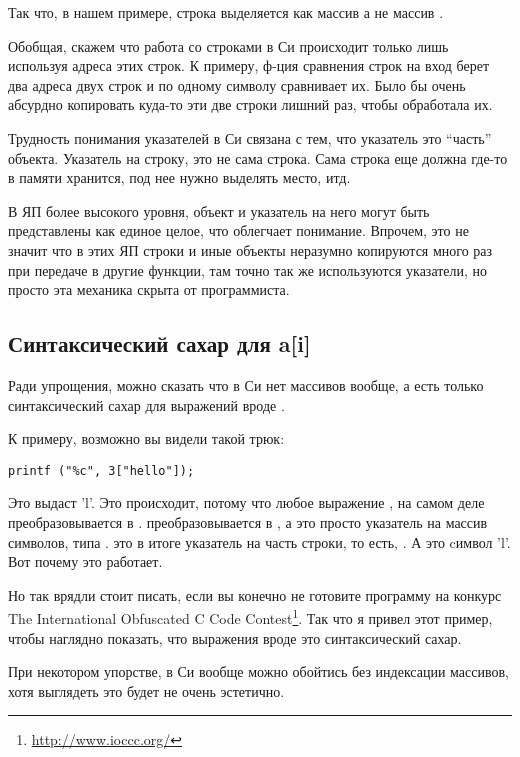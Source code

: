 Так что, в нашем примере, строка выделяется как массив  а не массив .

Обобщая, скажем что работа со строками в Си происходит только лишь используя адреса этих строк. К примеру,
ф-ция сравнения строк  на вход берет два адреса двух строк и по одному символу сравнивает их.
Было бы очень абсурдно копировать куда-то эти две строки лишний раз, чтобы  обработала их.

Трудность понимания указателей в Си связана с тем, что указатель это ``часть'' объекта. Указатель на строку,
это не сама строка. Сама строка еще должна где-то в памяти хранится, под нее нужно выделять место, итд.

В ЯП более высокого уровня, объект и указатель на него могут быть представлены как единое целое, что облегчает
понимание.
Впрочем, это не значит что в этих ЯП строки и иные объекты неразумно копируются много раз при передаче 
в другие функции,
там точно так же используются указатели, но просто эта механика скрыта от программиста.

\subsection{Синтаксический сахар для a[i]}

Ради упрощения, можно сказать что в Си нет массивов вообще, а есть только синтаксический сахар для выражений
вроде .

К примеру, возможно вы видели такой трюк:

\begin{lstlisting}
printf ("%c", 3["hello"]);
\end{lstlisting}

Это выдаст 'l'. 
Это происходит, потому что любое выражение , на самом деле преобразовывается в 
\cite[6.5.2.1]{C99TC3}.
 преобразовывается в , а  это просто указатель на массив символов, 
типа .
 это в итоге указатель на часть строки, то есть, . А  это cимвол 'l'. 
Вот почему это работает.

Но так врядли стоит писать, если вы конечно не готовите программу на конкурс 
The International Obfuscated C Code Contest\footnote{\url{http://www.ioccc.org/}}.
Так что я привел этот пример, чтобы наглядно показать, 
что выражения вроде  это синтаксический сахар.

При некотором упорстве, в Си вообще можно обойтись без индексации массивов, хотя выглядеть это будет не очень
эстетично.

